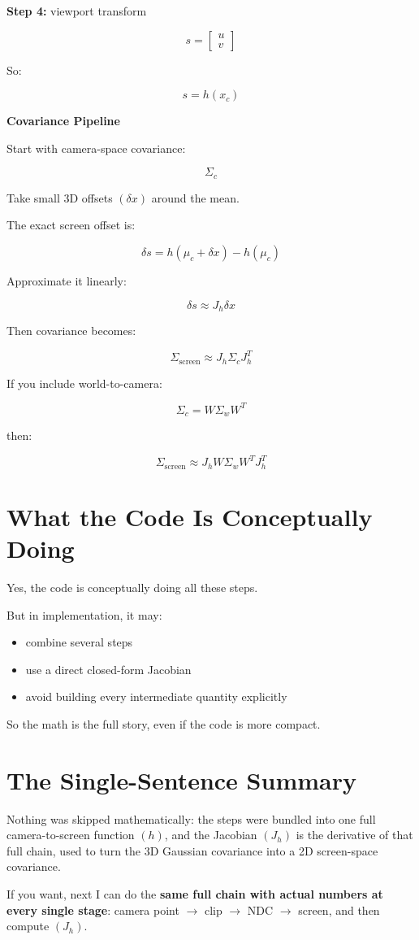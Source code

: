 \documentclass[11pt,letterpaper]{article}
\begin{document}
\textbf{Step 4:} viewport transform

\[
s =
\begin{bmatrix}
u\\
v
\end{bmatrix}
\]

So:

\[
s = h(x_c)
\]

\textbf{Covariance Pipeline}

Start with camera-space covariance:

\[
\Sigma_c
\]

Take small 3D offsets $(\delta x)$ around the mean.

The exact screen offset is:

\[
\delta s = h(\mu_c + \delta x) - h(\mu_c)
\]

Approximate it linearly:

\[
\delta s \approx J_h \delta x
\]

Then covariance becomes:

\[
\Sigma_{\text{screen}} \approx J_h \Sigma_c J_h^T
\]

If you include world-to-camera:

\[
\Sigma_c = W \Sigma_w W^T
\]

then:

\[
\Sigma_{\text{screen}} \approx J_h W \Sigma_w W^T J_h^T
\]

\section{What the Code Is Conceptually Doing}

Yes, the code is conceptually doing all these steps.

But in implementation, it may:

\begin{itemize}
\item combine several steps
\item use a direct closed-form Jacobian
\item avoid building every intermediate quantity explicitly
\end{itemize}

So the math is the full story, even if the code is more compact.

\section{The Single-Sentence Summary}

Nothing was skipped mathematically: the steps were bundled into one full camera-to-screen function $(h)$, and the Jacobian $(J_h)$ is the derivative of that full chain, used to turn the 3D Gaussian covariance into a 2D screen-space covariance.

If you want, next I can do the \textbf{same full chain with actual numbers at every single stage}: camera point $\to$ clip $\to$ NDC $\to$ screen, and then compute $(J_h)$.
\end{document}
